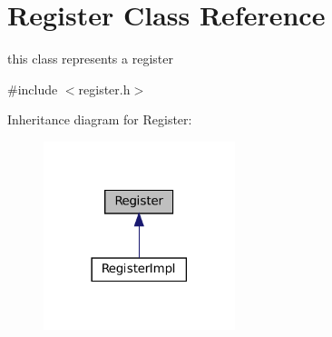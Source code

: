 \hypertarget{classRegister}{}\section{Register Class Reference}
\label{classRegister}


this class represents a register  




{\ttfamily \#include $<$register.\+h$>$}



Inheritance diagram for Register\+:
\nopagebreak
\begin{figure}[H]
\begin{center}
\leavevmode
\includegraphics[width=158pt]{classRegister__inherit__graph}
\end{center}
\end{figure}
